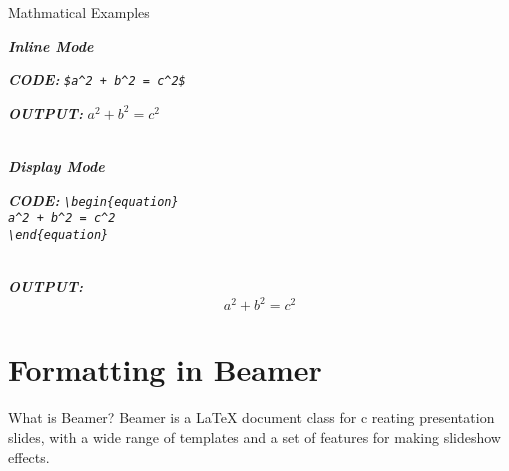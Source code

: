\documentclass[pdf]{beamer}
\begin{document}
\begin{frame}{Mathmatical Examples}
    \par \textbf{\textit{Inline Mode}}
    \par \textbf{\textit{CODE:}} {\textit{\texttt{\$a\^{}2 + b\^{}2 = c\^{}2\$}}}
    \par \textbf{\textit{OUTPUT:}} $a^2 + b^2 = c^2$
    \par \textbf{\textit{\\Display Mode}}
    \par \textbf{\textit{CODE:}} {\textit{\texttt{\textbackslash begin\{equation\} \\ a\^{}2 + b\^{}2 = c\^{}2 \\ \textbackslash end\{equation\}}}}
    \par \textbf{\textit{\\OUTPUT:}} \begin{equation} a^2 + b^2 = c^2 \end{equation}
\end{frame}



\section{Formatting in Beamer}
\begin{frame}{What is Beamer?}
    Beamer is a LaTeX document class for c
    reating presentation slides, with a 
    wide range of templates and a set of 
    features for making slideshow effects. 
\end{frame}
\end{document}
